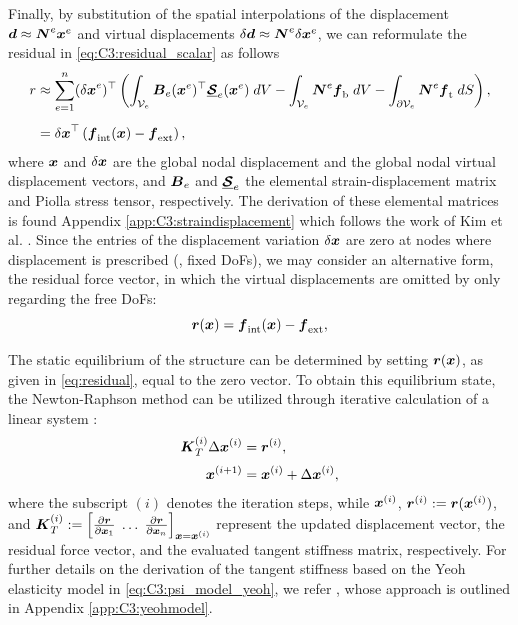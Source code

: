 Finally, by substitution of the spatial interpolations of the displacement ${\boldsymbol{d}} \approx {\boldsymbol{N}}^e {\boldsymbol{x}}^e$ and virtual displacements $\delta {\boldsymbol{d}} \approx {\boldsymbol{N}}^e\delta {\boldsymbol{x}}^e$, we can reformulate the residual in \eqref{eq:C3:residual_scalar} as follows
%
\begin{align}
r & \approx \sum_{e=1}^{n} ({\delta {\boldsymbol{x}}}^e)^\top \left(\int_{\mathcal{V}_e} {\boldsymbol{B}}_e({\boldsymbol{x}}^e)^\top \underline{\boldsymbol{\mathcal{S}}}_e({\boldsymbol{x}}^e) \; dV  - \int_{\mathcal{V}_e} {\boldsymbol{N}}^{e} {\boldsymbol{f}}_{\textrm{b}} \; dV  - \int_{\partial \mathcal{V}_e} {\boldsymbol{N}}^{e} {\boldsymbol{f}}_{\textrm{t}} \; dS \right), \notag \\[0.5em]
& = {\delta {\boldsymbol{x}}}^\top \left( {\boldsymbol{f}}_{\textrm{int}}({\boldsymbol{x}}) - {\boldsymbol{f}}_{\textrm{ext}} \right),
\end{align}
%
where ${\boldsymbol{x}}$ and $\delta {\boldsymbol{x}}$ are the global nodal displacement and the global nodal virtual displacement vectors, and ${\boldsymbol{B}}_e$ and $\underline{\boldsymbol{\mathcal{S}}}_e$ the elemental strain-displacement matrix and Piolla stress tensor, respectively. The derivation of these elemental matrices is found Appendix \ref{app:C3:straindisplacement} which follows the work of Kim et al. \cite{Kim2018}. Since the entries of the displacement variation ${\delta {\boldsymbol{x}}}$ are zero at nodes where displacement is prescribed (\ie, fixed DoFs), we may consider an alternative form, the residual force vector, in which the virtual displacements are omitted by only regarding the free DoFs:
%
\begin{equation}
{\boldsymbol{r}}({\boldsymbol{x}}) = {\boldsymbol{f}}_{\textrm{int}}({\boldsymbol{x}}) - {\boldsymbol{f}}_{\textrm{ext}},
\label{eq:residual}
\end{equation}
%

The static equilibrium of the structure can be determined by setting ${\boldsymbol{r}}({\boldsymbol{x}})$, as given in \eqref{eq:residual}, equal to the zero vector. To obtain this equilibrium state, the Newton-Raphson method can be utilized through iterative calculation of a linear system \cite{Gain2013Dec,Kim2018,Holzapfel2002}:
%
\begin{align}
{\boldsymbol{K}}_T^{(i)} \Delta {\boldsymbol{x}}^{(i)} & = {\boldsymbol{r}}^{(i)}, \notag \\[0.25em]
{\boldsymbol{x}}^{(i+1)} & = {\boldsymbol{x}}^{(i)} + \Delta {\boldsymbol{x}}^{(i)}, \notag
\end{align}
%
where the subscript $(i)$ denotes the iteration steps, while ${\boldsymbol{x}}^{(i)}$, ${\boldsymbol{r}}^{(i)} := {\boldsymbol{r}}({\boldsymbol{x}}^{(i)})$, and ${\boldsymbol{K}}_T^{(i)}:=\left[\tfrac{\partial {\boldsymbol{r}}}{\partial {\boldsymbol{x}}_1} \; \hdots \; \tfrac{\partial {\boldsymbol{r}}}{\partial {\boldsymbol{x}}_n} \right]_{{\boldsymbol{x}} = {\boldsymbol{x}}^{(i)}}$ represent the updated displacement vector, the residual force vector, and the evaluated tangent stiffness matrix, respectively. For further details on the derivation of the tangent stiffness based on the Yeoh elasticity model in \eqref{eq:C3:psi_model_yeoh}, we refer \cite{Renaud2011}, whose approach is outlined in Appendix \ref{app:C3:yeohmodel}.

